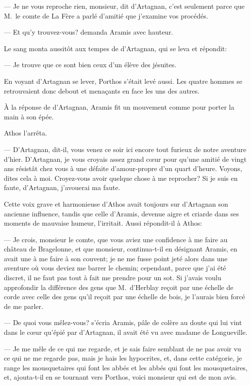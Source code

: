 — Je ne vous reproche rien, monsieur, dit d'Artagnan, c'est seulement parce que M.~le comte de La Fère a parlé d'amitié que j'examine vos procédés.

— Et qu'y trouvez-vous? demanda Aramis avec hauteur.

Le sang monta aussitôt aux tempes de d'Artagnan, qui se leva et répondit:

— Je trouve que ce sont bien ceux d'un élève des jésuites.

En voyant d'Artagnan se lever, Porthos s'était levé aussi. Les quatre hommes se retrouvaient donc debout et menaçants en face les uns des autres.

À la réponse de d'Artagnan, Aramis fit un mouvement comme pour porter la main à son épée.

Athos l'arrêta.

— D'Artagnan, dit-il, vous venez ce soir ici encore tout furieux de notre aventure d'hier. D'Artagnan, je vous croyais assez grand cœur pour qu'une amitié de vingt ans résistât chez vous à une défaite d'amour-propre d'un quart d'heure. Voyons, dites cela à moi. Croyez-vous avoir quelque chose à me reprocher? Si je suis en faute, d'Artagnan, j'avouerai ma faute.

Cette voix grave et harmonieuse d'Athos avait toujours sur d'Artagnan son ancienne influence, tandis que celle d'Aramis, devenue aigre et criarde dans ses moments de mauvaise humeur, l'irritait. Aussi répondit-il à Athos:

— Je crois, monsieur le comte, que vous aviez une confidence à me faire au château de Bragelonne, et que monsieur, continua-t-il en désignant Aramis, en avait une à me faire à son couvent; je ne me fusse point jeté alors dans une aventure où vous deviez me barrer le chemin; cependant, parce que j'ai été discret, il ne faut pas tout à fait me prendre pour un sot. Si j'avais voulu approfondir la différence des gens que M.~d'Herblay reçoit par une échelle de corde avec celle des gens qu'il reçoit par une échelle de bois, je l'aurais bien forcé de me parler.

— De quoi vous mêlez-vous? s'écria Aramis, pâle de colère au doute qui lui vint dans le cœur qu'épié par d'Artagnan, il avait été vu avec madame de Longueville.

— Je me mêle de ce qui me regarde, et je sais faire semblant de ne pas avoir vu ce qui ne me regarde pas, mais je hais les hypocrites, et, dans cette catégorie, je range les mousquetaires qui font les abbés et les abbés qui font les mousquetaires, et, ajouta-t-il en se tournant vers Porthos, voici monsieur qui est de mon avis.

